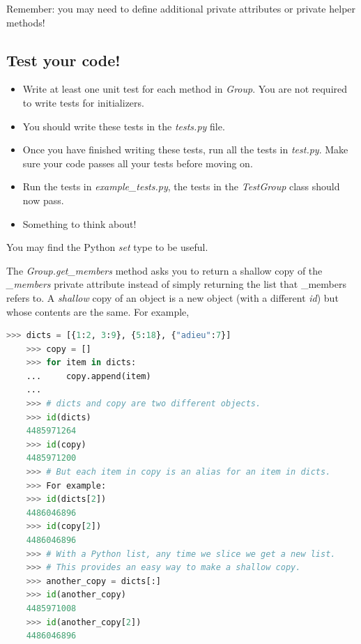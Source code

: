 \documentclass[12pt]{article}
\begin{document}
\bigskip

\noindent Remember: you may need to define additional private attributes or
private helper methods!

\bigskip

\subsection*{Test your code!}
\begin{itemize}
    \item Write at least one unit test for each method in \textit{Group}. You are
    not required to write tests for initializers.
    \item You should write these tests in the \textit{tests.py} file.
    \item Once you have finished writing these tests, run all the tests in \textit{test.py}.
    Make sure your code passes all your tests before moving on.
    \item Run the tests in \textit{example\_tests.py}, the tests in the \textit{TestGroup}
    class should now pass.
    \item Something to think about!
\end{itemize}

\bigskip

\noindent You may find the Python \textit{set} type to be useful.

\bigskip

\noindent The \textit{Group.get\_members} method asks you to return a shallow
copy of the \textit{\_members} private attribute instead of simply returning the list that
\_members refers to. A \textit{shallow} copy of an object is a new object (with a different
\textit{id}) but whose contents are the same. For example,

\bigskip

\begin{lstlisting}[language=python,caption={worksheet\_17\_q1\_solution.py}]
    >>> dicts = [{1:2, 3:9}, {5:18}, {"adieu":7}]
    >>> copy = []
    >>> for item in dicts:
    ...     copy.append(item)
    ...
    >>> # dicts and copy are two different objects.
    >>> id(dicts)
    4485971264
    >>> id(copy)
    4485971200
    >>> # But each item in copy is an alias for an item in dicts.
    >>> For example:
    >>> id(dicts[2])
    4486046896
    >>> id(copy[2])
    4486046896
    >>> # With a Python list, any time we slice we get a new list.
    >>> # This provides an easy way to make a shallow copy.
    >>> another_copy = dicts[:]
    >>> id(another_copy)
    4485971008
    >>> id(another_copy[2])
    4486046896
\end{lstlisting}
\end{document}
